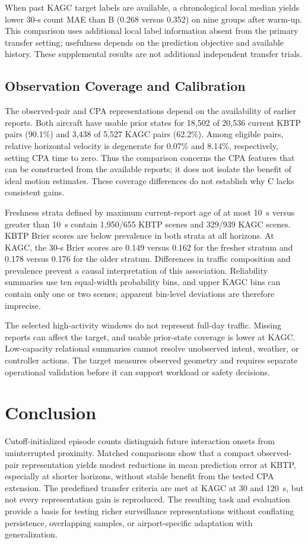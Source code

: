 \documentclass[10pt,journal,letterpaper]{IEEEtran}
\begin{document}
When past KAGC target labels are available, a chronological local median yields lower 30-s count MAE than B (0.268 versus 0.352) on nine groups after warm-up. This comparison uses additional local label information absent from the primary transfer setting; usefulness depends on the prediction objective and available history. These supplemental results are not additional independent transfer trials.

\subsection{Observation Coverage and Calibration}
The observed-pair and CPA representations depend on the availability of earlier reports. Both aircraft have usable prior states for 18,502 of 20,536 current KBTP pairs (90.1\%) and 3,438 of 5,527 KAGC pairs (62.2\%). Among eligible pairs, relative horizontal velocity is degenerate for 0.07\% and 8.14\%, respectively, setting CPA time to zero. Thus the comparison concerns the CPA features that can be constructed from the available reports; it does not isolate the benefit of ideal motion estimates. These coverage differences do not establish why C lacks consistent gains.

Freshness strata defined by maximum current-report age of at most 10~s versus greater than 10~s contain 1,950/655 KBTP scenes and 329/939 KAGC scenes. KBTP Brier scores are below prevalence in both strata at all horizons. At KAGC, the 30-s Brier scores are 0.149 versus 0.162 for the fresher stratum and 0.178 versus 0.176 for the older stratum. Differences in traffic composition and prevalence prevent a causal interpretation of this association. Reliability summaries use ten equal-width probability bins, and upper KAGC bins can contain only one or two scenes; apparent bin-level deviations are therefore imprecise.


The selected high-activity windows do not represent full-day traffic. Missing reports can affect the target, and usable prior-state coverage is lower at KAGC. Low-capacity relational summaries cannot resolve unobserved intent, weather, or controller actions. The target measures observed geometry and requires separate operational validation before it can support workload or safety decisions.

\section{Conclusion}
Cutoff-initialized episode counts distinguish future interaction onsets from uninterrupted proximity. Matched comparisons show that a compact observed-pair representation yields modest reductions in mean prediction error at KBTP, especially at shorter horizons, without stable benefit from the tested CPA extension. The predefined transfer criteria are met at KAGC at 30 and 120~s, but not every representation gain is reproduced. The resulting task and evaluation provide a basis for testing richer surveillance representations without conflating persistence, overlapping samples, or airport-specific adaptation with generalization.
\end{document}
